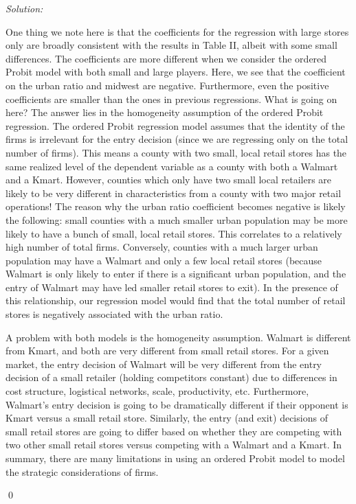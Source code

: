 \documentclass[12pt]{article}
\newenvironment{sol}
    {\emph{Solution:}
    }
    {
    \qed
    }
\begin{document}
\begin{sol}
\begin{table}[!htbp]
      \end{table} 
      One thing we note here is that the coefficients for the regression with large stores only are broadly consistent with the results in Table II, albeit with some small differences. The coefficients are more different when we consider the ordered Probit model with both small and large players. Here, we see that the coefficient on the urban ratio and midwest are negative. Furthermore, even the positive coefficients are smaller than the ones in previous regressions. What is going on here? The answer lies in the homogeneity assumption of the ordered Probit regression. The ordered Probit regression model assumes that the identity of the firms is irrelevant for the entry decision (since we are regressing only on the total number of firms). This means a county with two small, local retail stores has the same realized level of the dependent variable as a county with both a Walmart and a Kmart. However, counties which only have two small local retailers are likely to be very different in characteristics from a county with two major retail operations! The reason why the urban ratio coefficient becomes negative is likely the following: small counties with a much smaller urban population may be more likely to have a bunch of small, local retail stores. This correlates to a relatively high number of total firms. Conversely, counties with a much larger urban population may have a Walmart and only a few local retail stores (because Walmart is only likely to enter if there is a significant urban population, and the entry of Walmart may have led smaller retail stores to exit). In the presence of this relationship, our regression model would find that the total number of retail stores is negatively associated with the urban ratio.

      A problem with both models is the homogeneity assumption. Walmart is different from Kmart, and both are very different from small retail stores. For a given market, the entry decision of Walmart will be very different from the entry decision of a small retailer (holding competitors constant) due to differences in cost structure, logistical networks, scale, productivity, etc. Furthermore, Walmart's entry decision is going to be dramatically different if their opponent is Kmart versus a small retail store. Similarly, the entry (and exit) decisions of small retail stores are going to differ based on whether they are competing with two other small retail stores versus competing with a Walmart and a Kmart. In summary, there are many limitations in using an ordered Probit model to model the strategic considerations of firms.
    \end{sol}
\end{document}
